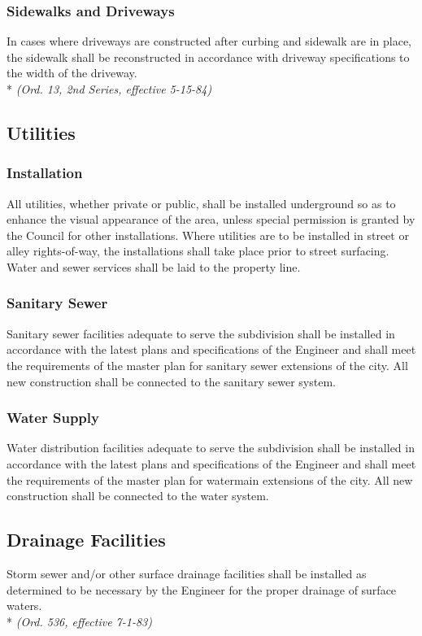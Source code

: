 \subsubsection{Sidewalks and Driveways}
In cases where driveways are constructed after curbing and sidewalk are in place, the sidewalk shall be reconstructed in accordance with driveway specifications to the width of the driveway.\\*
\emph{(Ord. 13, 2nd Series, effective 5-15-84)}
\subsection{Utilities}
\subsubsection{Installation}
All utilities, whether private or public, shall be installed underground so as to enhance the visual appearance of the area, unless special permission is granted by the Council for other installations. Where utilities are to be installed in street or alley rights-of-way, the installations shall take place prior to street surfacing. Water and sewer services shall be laid to the property line.
\subsubsection{Sanitary Sewer}
Sanitary sewer facilities adequate to serve the subdivision shall be installed in accordance with the latest plans and specifications of the Engineer and shall meet the requirements of the master plan for sanitary sewer extensions of the city. All new construction shall be connected to the sanitary sewer system.
\subsubsection{Water Supply}
Water distribution facilities adequate to serve the subdivision shall be installed in accordance with the latest plans and specifications of the Engineer and shall meet the requirements of the master plan for watermain extensions of the city. All new construction shall be connected to the water system.
\subsection{Drainage Facilities}
Storm sewer and/or other surface drainage facilities shall be installed as determined to be necessary by the Engineer for the proper drainage of surface waters.\\*
\emph{(Ord. 536, effective 7-1-83)}
